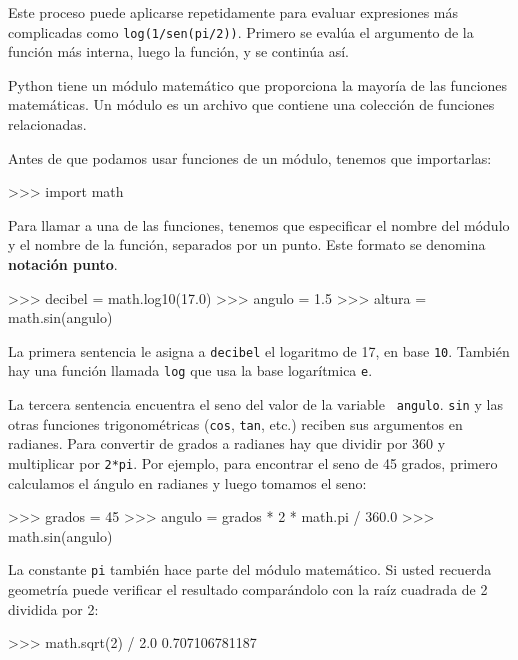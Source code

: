 Este proceso puede aplicarse repetidamente para evaluar expresiones
más complicadas como  \texttt{log(1/sen(pi/2))}. Primero se evalúa el argumento
de la función más interna, luego la función, y se continúa así.

Python tiene un módulo matemático que proporciona la mayoría de las funciones
matemáticas. Un módulo es un archivo que contiene una colección de
funciones relacionadas.


Antes de que podamos usar funciones de un módulo, tenemos que importarlas:

\beforeverb
\begin{pyconcode}
>>> import math
\end{pyconcode}
\afterverb
%

Para llamar a una de las funciones, tenemos que especificar el nombre
del módulo y el nombre de la función, separados por un punto. Este 
formato se denomina {\bf notación punto}.


\beforeverb
\begin{pyconcode}
>>> decibel = math.log10(17.0)
>>> angulo = 1.5
>>> altura = math.sin(angulo)
\end{pyconcode}
\afterverb
%

La primera sentencia le asigna a \texttt{decibel} el logaritmo de 17, en base
\texttt{10}. También hay una función llamada \texttt{log} que usa la 
base logarítmica \texttt{e}. 

La tercera sentencia encuentra el seno del valor  de la  variable {\tt
angulo}. \texttt{sin} y las otras funciones  trigonométricas (\texttt{cos},
\texttt{tan}, etc.)  reciben sus argumentos en radianes. Para convertir
de grados a radianes hay que dividir por 360 y multiplicar por \texttt{2*pi}.  
Por ejemplo, para encontrar el seno de 45 grados, primero calculamos
el ángulo en radianes y luego tomamos el seno:

\beforeverb
\begin{pyconcode}
>>> grados = 45
>>> angulo = grados * 2 * math.pi / 360.0
>>> math.sin(angulo)
\end{pyconcode}
\afterverb
%

La constante \texttt{pi} también hace parte del módulo matemático. Si usted
recuerda geometría puede verificar el resultado comparándolo con la
raíz cuadrada de 2 dividida por 2:

\beforeverb
\begin{pyconcode}
>>> math.sqrt(2) / 2.0
0.707106781187
\end{pyconcode}
\afterverb
%

